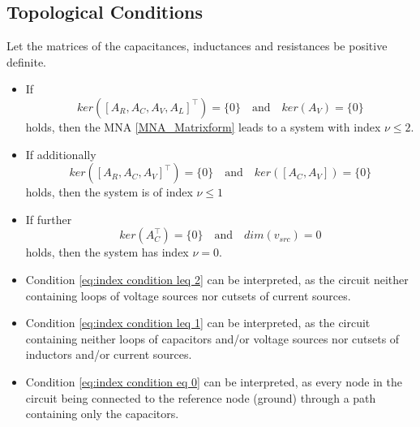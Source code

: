 	\subsection{Topological Conditions}
	\begin{frame}
		\begin{theorem}[Index conditions] %
			Let the matrices of the capacitances, inductances and resistances be positive definite.
			\begin{itemize}
				\item If
				\begin{equation}
					\label{eq:index condition leq 2}
					ker([A_R, A_C, A_V, A_L]^\top) = \{0\} \quad \text{and} \quad ker(A_V) = \{0\}
				\end{equation}
				holds, then the MNA \eqref{MNA_Matrixform} leads to a system with index $\nu \leq 2$.
				
				\item If additionally
				\begin{equation}
					\label{eq:index condition leq 1}
					ker([A_R, A_C, A_V]^\top) = \{0\} \quad \text{and} \quad ker([A_C, A_V]) = \{0\}
				\end{equation}
				holds, then the system is of index $\nu \leq 1$
				
				\item If further
				\begin{equation}
					\label{eq:index condition eq 0}
					ker(A_C^\top) = \{0\} \quad \text{and} \quad dim(v_{src}) = 0
				\end{equation}
				holds, then the system has index $\nu = 0$.
			\end{itemize}
		\end{theorem}
	\end{frame}
	\begin{frame}
		\begin{itemize}
			\item Condition \eqref{eq:index condition leq 2} can be interpreted, as the circuit neither containing loops of voltage sources nor cutsets of current sources.
			\item Condition \eqref{eq:index condition leq 1} can be interpreted, as the circuit containing neither loops of capacitors and/or voltage sources nor cutsets of inductors and/or current sources.
			\item Condition \eqref{eq:index condition eq 0} can be interpreted, as every node in the circuit being connected to the reference node (ground) through a path containing only the capacitors.
		\end{itemize}
	\end{frame}

